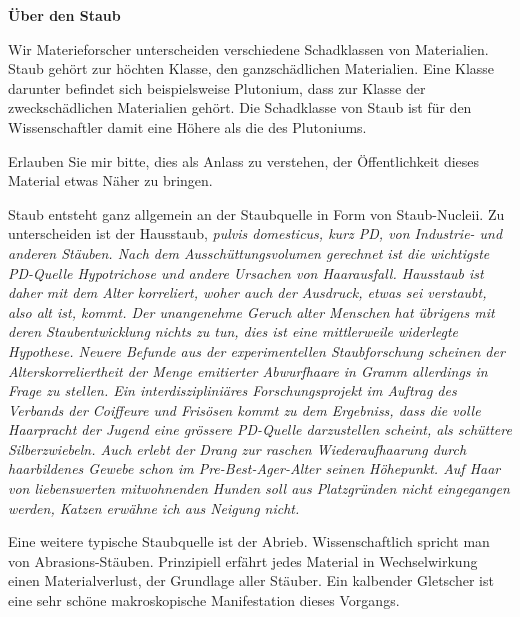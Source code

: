 \thispagestyle{empty}
\begin{center}
\end{center}
\vskip 2cm
{\Large\color{farbe}\hfill{\merriweathersans \textbf{Über den Staub}}}
\newpage
\lettrine[lines=2, lhang=.2, loversize=.25, lraise=0.05, findent=0.1em,
nindent=0em]{W}{}ir Materieforscher unterscheiden verschiedene Schadklassen von Materialien. Staub gehört zur höchten Klasse, den ganzschädlichen Materialien. Eine Klasse darunter befindet sich beispielsweise Plutonium, dass zur Klasse der zweckschädlichen Materialien gehört. Die Schadklasse von Staub ist für den Wissenschaftler damit eine Höhere als die des Plutoniums.  

Erlauben Sie mir bitte, dies als Anlass zu verstehen, der Öffentlichkeit dieses Material etwas Näher zu bringen. 

Staub entsteht ganz allgemein an der Staubquelle in Form von  Staub-Nucleii. Zu unterscheiden ist der Hausstaub, \itshape{pulvis domesticus}, kurz PD, von Industrie- und anderen Stäuben. Nach dem Ausschüttungsvolumen gerechnet ist die wichtigste PD-Quelle Hypotrichose und andere Ursachen von Haarausfall. Hausstaub ist daher mit dem Alter korreliert, woher auch der Ausdruck, etwas sei verstaubt, also alt ist, kommt. Der unangenehme Geruch alter Menschen hat übrigens mit deren Staubentwicklung nichts zu tun, dies ist eine mittlerweile widerlegte Hypothese. Neuere Befunde aus der experimentellen Staubforschung scheinen der Alterskorreliertheit der Menge emitierter Abwurfhaare in Gramm allerdings in Frage zu stellen. Ein interdiszipliniäres Forschungsprojekt im Auftrag des Verbands der Coiffeure und Frisösen kommt zu dem Ergebniss, dass die volle Haarpracht der Jugend eine grössere PD-Quelle darzustellen scheint, als schüttere Silberzwiebeln. Auch erlebt der Drang zur raschen Wiederaufhaarung durch haarbildenes Gewebe schon im Pre-Best-Ager-Alter seinen Höhepunkt. Auf Haar von liebenswerten mitwohnenden Hunden soll aus Platzgründen nicht eingegangen werden, Katzen erwähne ich aus Neigung nicht.

Eine weitere typische Staubquelle ist der Abrieb. Wissenschaftlich spricht man von Abrasions-Stäuben. Prinzipiell erfährt jedes Material in Wechselwirkung einen Materialverlust, der Grundlage aller Stäuber. Ein kalbender Gletscher ist eine sehr schöne makroskopische Manifestation dieses Vorgangs.

